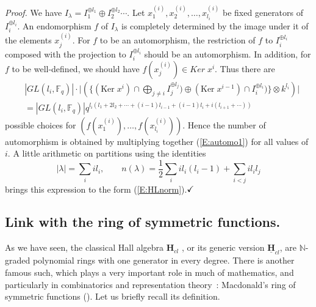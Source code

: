 \documentclass[a4paper,10pt]{amsart}
\def\H{\mathbf{H}}
\def\qed{$\hfill \checkmark$}
\def\N{\mathbb{N}}
\numberwithin{equation}{section}
\begin{document}
\noindent
\textit{Proof.} We have $I_{\lambda}=I_1^{\oplus l_1} \oplus I_2^{\oplus l_2} \cdots$. Let $x^{(i)}_1, x^{(i)}_2, \ldots , x^{(i)}_{l_i}$ be fixed generators of $I_i^{\oplus l_i}$. An endomorphism $f$ of $I_{\lambda}$ is completely determined by the image under it of the elements $x^{(i)}_j$. For $f$ to be an automorphism, the restriction of $f$ to $I_i^{\oplus l_i}$ composed with the projection to $I_i^{\oplus l_i}$ should be an automorphism. In addition, for $f$ to be well-defined, we should have $f(x_j^{(i)}) \in {Ker}\; x^i$. Thus there are
\begin{equation}\label{E:automo1}
\begin{split}
 &|GL(l_i, \mathbb{F}_q)| \cdot \bigg| \left( \bigg\{(\text{Ker}\; x^i) \cap \bigoplus_{j \neq i} I_j^{\oplus l_j}) \oplus (\text{Ker}\; x^{i-1}) \cap I_i^{\oplus l_i})\bigg\} \otimes k^{l_i} \right)\bigg| \\
&=|GL(l_i, \mathbb{F}_q)| q^{l_i(l_1 + 2 l_2 + \cdots + (i-1)l_{i-1} + (i-1) l_i + i(l_{i+1} + \cdots))}
\end{split}
\end{equation}
possible choices for $(f(x_1^{(i)}), \ldots , f(x_{l_i}^{(i)}))$. Hence the number of automorphism is obtained by multiplying together (\ref{E:automo1}) for all values of $i$. A little arithmetic on partitions
using the identities
$$|\lambda|=\sum_i i l_i, \qquad n(\lambda)=\frac{1}{2}\sum_i i l_i (l_i-1) + \sum_{i<j} i l_i l_j$$
brings this expression to the form (\ref{E:HLnorm}).\qed

\vspace{.2in}

\subsection{Link with the ring of symmetric functions.}

\vspace{.15in}

As we have seen, the classical Hall algebra $\H_{cl}$ , or its generic version $\underline{\H}_{cl}$, are $\N$-graded polynomial rings with one generator in every degree. There is another famous such, which plays a very important role in much of mathematics, and particularly in combinatorics and representation theory~: Macdonald's ring of symmetric functions (\cite{Mac}). Let us briefly recall its definition.
\end{document}
